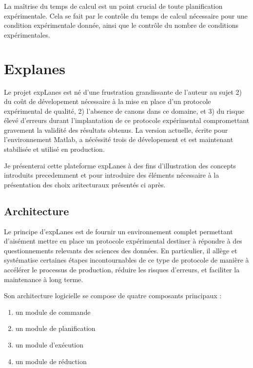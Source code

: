 La maîtrise du temps de calcul est un point crucial de toute planification expérimentale. Cela se fait par le contrôle du temps de calcul nécessaire pour une condition expérimentale donnée, ainsi que le contrôle du nombre de conditions expérimentales.

\section{Explanes} \label{sec:explanes}

Le projet expLanes est né d'une frustration grandissante de l'auteur au sujet 2) du coût de dévelopement nécessaire à la mise en place d'un protocole expérimental de qualité, 2) l'absence de canons dans ce domaine, et 3) du risque élevé d'erreurs durant l'implantation de ce protocole expérimental compromettant gravement la validité des résultats obtenus. La version actuelle, écrite pour l'environnement Matlab, a nécéssité trois de dévelopement et est maintenant stabilisée et utilisé en production.

Je présenterai cette plateforme expLanes à des fins d'illustration des concepts introduits precedemment et pour introduire des éléments nécessaire à la présentation des choix aritecturaux présentés ci après.

\subsection{Architecture}

Le principe d'expLanes est de fournir un environnement complet permettant d'aisément mettre en place un protocole expérimental destiner à répondre à des questionnements relevants des sciences des données. En particulier, il allège et systématise certaines étapes incontournables de ce type de protocole de manière à accélérer le processus de production, réduire les risques d'erreurs, et faciliter la maintenance à long terme.

Son architecture logicielle se compose de quatre composants principaux :
\begin{enumerate}
  \item un module de commande
  \item un module de planification
  \item un module d'exécution
  \item un module de réduction
\end{enumerate}

